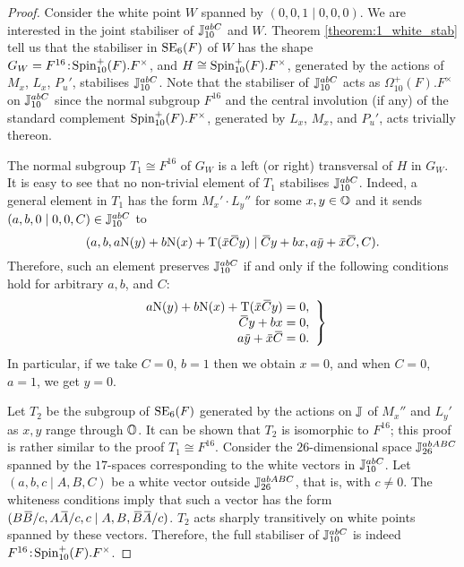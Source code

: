 \begin{proof}
	Consider the white point $W$ spanned by $(0,0,1 \mid 0,0,0)$. We are interested in the joint stabiliser of 
	$\mathbb{J}_{10}^{abC}$ and $W$. Theorem \ref{theorem:1_white_stab} tell us that the stabiliser in $\mathrm{SE}_6(F)$ of 
	$W$ has the shape $G_W = F^{16}\mathord{{\;\!{:}\;\!}}\mathrm{Spin}_{10}^+(F).F^{\times}$, and 
	$H \cong  \mathrm{Spin}_{10}^+(F).F^{\times}$, generated by the actions of $M_x$, $L_x$, $P_u'$, stabilises
	$\mathbb{J}_{10}^{abC}$. Note that the stabiliser of $\mathbb{J}_{10}^{abC}$ acts as  
	$\Omega_{10}^+(F).F^{\times}$ on $\mathbb{J}_{10}^{abC}$ since the normal subgroup $F^{16}$ and the 
	central involution (if any) of the standard complement $\mathrm{Spin}_{10}^+(F).F^{\times}$, generated
	by $L_x$, $M_x$, and $P_u'$, acts trivially thereon. 
	
	The normal subgroup $T_1 \cong F^{16}$ of $G_W$ is a left (or right) transversal 
	of $H$ in $G_W$. It is easy to see that no non-trivial element of $T_1$ stabilises $\mathbb{J}_{10}^{abC}$. Indeed, a general
	element in $T_1$ has the form $M_x' \cdot L_y''$ for some $x,y \in \mathbb{O}$ and it sends \mbox{$(a,b,0 \mid 0,0,C) \in \mathbb{J}_{10}^{abC}$}
	to
	\begin{equation*}
		(a,b,a\NN(y) + b\NN(x) +  \Tr(\ovx \ovC y) \mid
			 \ovC y + bx, a\ovy + \ovx\ovC, C).
	\end{equation*}
	Therefore, such an element preserves $\mathbb{J}_{10}^{abC}$ if and only if the following conditions hold for arbitrary $a,b$, and $C$:
	\begin{equation*}
		\left.
		\begin{array}{r@{\;}c@{\;}l}
			a\NN(y) + b\NN(x) + \Tr(\ovx \ovC y) & = & 0, \\
			\ovC y + bx & = & 0, \\
			a\ovy + \ovx\ovC & = & 0.
		\end{array}
		\right\}
	\end{equation*}
	In particular, if we take $C = 0$, $b = 1$ then we obtain $x = 0$, and when $C = 0$, $a = 1$, we get $y = 0$. 
	
	Let $T_2$ be the subgroup of $\mathrm{SE}_6(F)$ generated by the actions on $\mathbb{J}$ of $M_x''$ and $L_y'$ as $x,y$ range through $\mathbb{O}$. 
	It can be shown that $T_2$ is isomorphic to $F^{16}$; this proof is rather similar to the proof $T_1 \cong F^{16}$. 
	Consider the $26$-dimensional space $\mathbb{J}_{26}^{abABC}$ spanned by the $17$-spaces corresponding to the white vectors in 
	$\mathbb{J}_{10}^{abC}$. Let $(a,b,c \mid A,B,C)$ be a white vector outside $\mathbb{J}_{26}^{abABC}$, that is, with $c \neq 0$. The whiteness conditions
	imply that such a vector has the form $(B\ovB / c, A\ovA/c, c \mid A, B, \ovB \ovA / c)$. $T_2$ acts sharply transitively on white points
	spanned by these vectors. Therefore, the full stabiliser of $\mathbb{J}_{10}^{abC}$ is indeed 
	$F^{16}\mathord{{\;\!{:}\;\!}}\mathrm{Spin}_{10}^+(F).F^{\times}$.
\end{proof}


